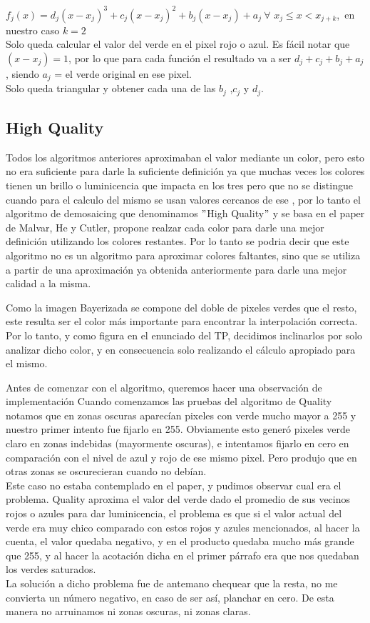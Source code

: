 $f_j(x) = d_j(x-x_j)^3 + c_j(x-x_j)^2 + b_j(x-x_j) + a_j\ \forall$ $x_j \leq x < x_{j+k}$,\ en nuestro caso $k = 2$ \\

Solo queda calcular el valor del verde en el pixel rojo o azul.
Es fácil notar que $(x-x_j) = 1$, por lo que para cada función el resultado va a ser $d_j+c_j+b_j+a_j$, siendo $a_j$ = el verde original en ese pixel.\\
Solo queda triangular y obtener cada una de las $b_j$ ,$c_j$ y $d_j$.

\subsection{High Quality}

Todos los algoritmos anteriores aproximaban el valor mediante un color, pero esto no era suficiente para darle la suficiente definición ya que muchas veces los colores tienen un brillo o luminicencia que impacta en los tres pero que no se distingue cuando para el calculo del mismo se usan valores cercanos de ese , por lo tanto el algoritmo de demosaicing que denominamos $"$High Quality$"
$ y se basa en el paper de Malvar, He y Cutler, propone realzar cada color para darle una mejor definición utilizando los colores restantes. Por lo tanto se podria decir que este algoritmo no es un algoritmo para aproximar colores faltantes, sino que se utiliza a partir de una aproximación ya obtenida anteriormente para darle una mejor calidad a la misma.

Como la imagen Bayerizada se compone del doble de pixeles verdes que el resto, este resulta ser el color más importante para encontrar la interpolación correcta. Por lo tanto, y como figura en el enunciado del TP, decidimos inclinarlos por solo analizar dicho color, y en consecuencia solo realizando el cálculo apropiado para el mismo.

Antes de comenzar con el algoritmo, queremos hacer una observación de implementación
Cuando comenzamos las pruebas del algoritmo de Quality notamos que en zonas oscuras aparecían pixeles con verde mucho mayor a 255 y nuestro primer intento fue fijarlo en 255. Obviamente esto generó pixeles verde claro en zonas indebidas (mayormente oscuras), e intentamos fijarlo en cero en comparación con el nivel de azul y rojo de ese mismo pixel. Pero produjo que en otras zonas se oscurecieran cuando no debían.\\
Este caso no estaba contemplado en el paper, y pudimos observar cual era el problema. Quality aproxima el valor del verde dado el promedio de sus vecinos rojos o azules para dar luminicencia, el problema es que si el valor actual del verde era muy chico comparado con estos rojos y azules mencionados, al hacer la cuenta, el valor quedaba negativo, y en el producto quedaba mucho más grande que 255, y al hacer la acotación dicha en el primer párrafo era que nos quedaban los verdes saturados.\\
La solución a dicho problema fue de antemano chequear que la resta, no me convierta un número negativo, en caso de ser así, planchar en cero. De esta manera no arruinamos ni zonas oscuras, ni zonas claras.

